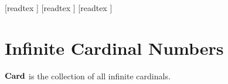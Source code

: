 \documentclass[10pt]{article}
\begin{document}
  \begin{imports}
    \begin{forthel}
      [readtex ]
      [readtex ]
      [readtex ]
    \end{forthel}
  \end{imports}


  \section*{Infinite Cardinal Numbers}

  \begin{forthel}
    \begin{definition}
      $\textbf{Card}$ is the collection of all infinite cardinals.
    \end{definition}
  \end{forthel}
\end{document}
